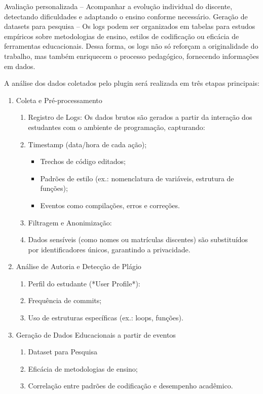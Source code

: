 \documentclass[12pt,a4paper]{article}
\begin{document}
	Avaliação personalizada – Acompanhar a evolução individual do discente, detectando dificuldades e adaptando o ensino conforme necessário.
	Geração de datasets para pesquisa – Os logs podem ser organizados em tabelas para estudos empíricos sobre metodologias de ensino, estilos de codificação ou eficácia de ferramentas educacionais.
	Dessa forma, os logs não só reforçam a originalidade do trabalho, mas também enriquecem o processo pedagógico, fornecendo informações em dados.
	
	A análise dos dados coletados pelo plugin será realizada em três etapas principais:  
\begin{enumerate}	
	\item  Coleta e Pré-processamento
	\begin{enumerate}
	\item  Registro de Logs:  
	Os dados brutos são gerados a partir da interação dos estudantes com o ambiente de programação, capturando:  
		\item  Timestamp (data/hora de cada ação);  
			\begin{itemize}
				\item Trechos de código editados;  
				\item  Padrões de estilo (ex.: nomenclatura de variáveis, estrutura de funções);  
				\item   Eventos como compilações, erros e correções.  
			\end{itemize}
		\item Filtragem e Anonimização:  
		\item Dados sensíveis (como nomes ou matrículas discentes) são substituídos por identificadores únicos, garantindo a privacidade.  
	\end{enumerate}
	\item  Análise de Autoria e Detecção de Plágio
		\begin{enumerate}
			\item  Perfil do estudante (*User Profile*):  
			\item  Frequência de commits;  
			\item  Uso de estruturas específicas (ex.: loops, funções).  
		\end{enumerate}
	\item  Geração de Dados Educacionais a partir de eventos
	\begin{enumerate}
		\item  Dataset para Pesquisa
		\item  Eficácia de metodologias de ensino;  
		\item  Correlação entre padrões de codificação e desempenho acadêmico.  
	\end{enumerate}
\end{enumerate}
\end{document}
